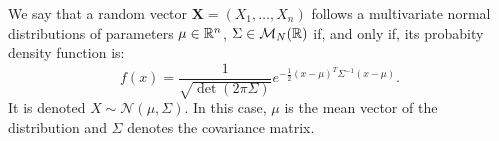 \begin{ndef}
We say that a random vector $\bm{X} = (X_1,\dots,X_n)$ follows a multivariate normal distributions of parameters
$\mu \in \mathbb{R}^n$, $\Sigma \in \mathcal M_N(\mathbb{R})$ if, and only if, its probabity density function is:
\begin{equation*}\label{gaussian:function:vector}
f(x) = \frac{1}{\sqrt{\det(2\pi \Sigma)}}e^{-\frac{1}{2}(x - \mu )^T \Sigma^{-1} (x-\mu)}.
\end{equation*}
It is denoted $X \sim \mathcal N(\mu, \Sigma)$.
In this case, $\mu$ is the mean vector of the distribution and $\Sigma$ denotes the covariance matrix.  
\end{ndef}
